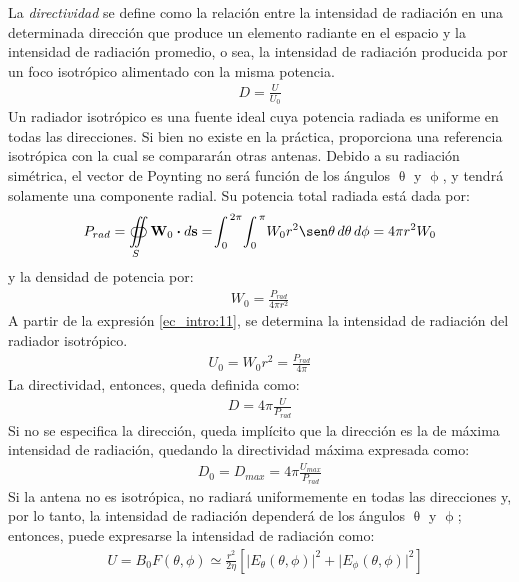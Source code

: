 La \emph{directividad} se define como la relación entre la intensidad de radiación en una determinada dirección que produce un elemento radiante en el espacio y la intensidad de radiación promedio, o sea, la intensidad de radiación producida por un foco isotrópico alimentado con la misma potencia.
\begin{align}
D = \frac{U}{U_0}
\label{ec_intro:9}
\end{align}
Un radiador isotrópico es una fuente ideal cuya potencia radiada es uniforme en todas las direcciones. Si bien no existe en la práctica, proporciona una referencia isotrópica con la cual se compararán otras antenas. Debido a su radiación simétrica, el vector de Poynting no será función de los ángulos $\uptheta$ y $\upphi$, y tendrá solamente una componente radial. Su potencia total radiada está dada por:
\begin{align}
P_{rad} = \oiint\limits_{S}\mathbf{W}_0\prodesc d\mathbf{s} = \!\int_0^{\,2\pi}\!\int_0^{\,\pi}\!W_0r^2\sen\theta\,d\theta\,d\phi = 4\pi r^2W_0
\label{ec_intro:10}
\end{align}
y la densidad de potencia por:
\begin{align}
W_0 = \frac{P_{rad}}{4\pi r^2}
\label{ec_intro:11}
\end{align}
A partir de la expresión \eqref{ec_intro:11}, se determina la intensidad de radiación del radiador isotrópico.
\begin{align}
U_0 = W_0r^2 = \frac{P_{rad}}{4\pi}
\label{ec_intro:12}
\end{align}
La directividad, entonces, queda definida como:
\begin{align}
D = 4\pi\frac{U}{P_{rad}}
\label{ec_intro:13}
\end{align}
Si no se especifica la dirección, queda implícito que la dirección es la de máxima intensidad de radiación, quedando la directividad máxima expresada como:
\begin{align}
D_0 = D_{max} = 4\pi\frac{U_{max}}{P_{rad}}
\label{ec_intro:14}
\end{align}
Si la antena no es isotrópica, no radiará uniformemente en todas las direcciones y, por lo tanto, la intensidad de radiación dependerá de los ángulos $\uptheta$ y $\upphi$; entonces, puede expresarse la intensidad de radiación como:
\begin{align}
&U = B_0F\left(\theta,\phi\right) \simeq \frac{r^2}{2\eta}\left[\lvert E_{\theta}\left(\theta,\phi\right)\rvert^2 + \lvert E_{\phi}\left(\theta,\phi\right)\rvert^2\right]
\label{ec_intro:15}
\end{align}
